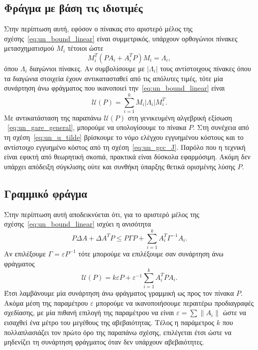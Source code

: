 \subsection{Φράγμα με βάση τις ιδιοτιμές}
Στην περίπτωση αυτή, εφόσον ο πίνακας στο αριστερό μέλος της
σχέσης~\eqref{eq:un_bound_linear} είναι συμμετρικός, υπάρχουν ορθογώνιοι
πίνακες μετασχηματισμού \( M_i \) τέτοιοι ώστε
\[
    M_i^{T}(PA_i + A_i^{T}P)M_i = \Lambda_i,
\]
όπου \( \Lambda_i \) διαγώνιοι πίνακες. Αν συμβολίσουμε με \( |\Lambda_i| \)
τους αντίστοιχους πίνακες όπου τα διαγώνια στοιχεία έχουν αντικατασταθεί από τις
απόλυτες τιμές, τότε μία συνάρτηση άνω φράγματος που ικανοποιεί
την~\eqref{eq:un_bound_linear} είναι
\[
    \mathcal{U}(P) = \sum_{i = 1}^{k}M_i|\Lambda_i|M_i^{T}.
\]
Με αντικατάσταση της παραπάνω \( \mathcal{U}(P) \) στη γενικευμένη αλγεβρική
εξίσωση ~\eqref{eq:un_gare_general}, μπορούμε να υπολογίσουμε το
πίνακα \( P \). Στη συνέχεια από τη σχέση~\eqref{eq:un_u_tilde} βρίσκουμε το
νόμο ελέγχου εγγυημένου κόστους και το αντίστοιχο εγγυημένο κόστος από τη
σχέση~\eqref{eq:un_gcc_J}. Παρόλο που η τεχνική είναι εφικτή από θεωρητική
σκοπιά, πρακτικά είναι δύσκολα εφαρμόσιμη. Ακόμη δεν υπάρχει απόδειξη σύγκλισης
ούτε και συνθήκη ύπαρξης θετικά ορισμένης λύσης \( P \).

\subsection{Γραμμικό φράγμα}
Στην περίπτωση αυτή αποδεικνύεται ότι, για το αριστερό
μέλος της σχέσης~\eqref{eq:un_bound_linear} ισχύει η ανισότητα
\[
    P\Delta A + \Delta A^{T}P \leq P\Gamma P + \sum_{i = 1}^{k}A_i^{T}\Gamma^{-1}A_i.
\]
Αν επιλέξουμε \( \Gamma = \varepsilon P^{-1} \) τότε μπορούμε να επιλέξουμε σαν
συνάρτηση άνω φράγματος
\begin{equation}\label{eq:gcc_u_linear}
    \mathcal{U}(P) = k\varepsilon P + \varepsilon^{-1}\sum_{i = 1}^{k}A_i^{T}PA_i.
\end{equation}
Έτσι λαμβάνουμε μία συνάρτηση άνω φράγματος γραμμική ως προς τον πίνακα
\( P \). Ακόμα μέση της παραμέτρου \( \varepsilon \) μπορούμε να ικανοποιήσουμε
περαιτέρω προδιαγραφές σχεδίασης, με μία πιθανή επιλογή της παραμέτρου να είναι
\( \varepsilon = \sum \| A_i \| \) ώστε να εισαχθεί ένα μέτρο του μεγέθους της
αβεβαιότητας. Τέλος η παράμετρος \( k \) που πολλαπλασιάζει τον πρώτο όρο της
παραπάνω σχέσης, επιλέγεται έτσι ώστε να μηδενίζει τη συνάρτηση φράγματος όταν
δεν υπάρχουν αβεβαιότητες.

